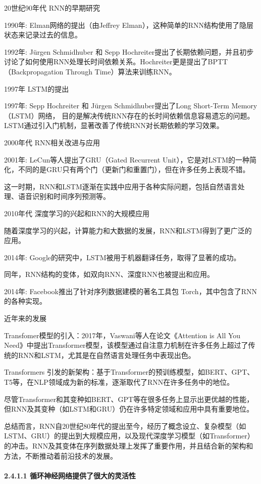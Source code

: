 20世纪90年代 RNN的早期研究

1990年: Elman网络的提出（由Jeffrey
Elman），这种简单的RNN结构使用了隐层状态来记录过去的信息。

1992年: Jürgen Schmidhuber 和 Sepp
Hochreiter提出了长期依赖问题，并且初步讨论了如何使用RNN处理长时间依赖关系。Hochreiter更是提出了BPTT（Backpropagation
Through Time）算法来训练RNN。

1997年 LSTM的提出

1997年: Sepp Hochreiter 和 Jürgen Schmidhuber提出了Long Short-Term
Memory（LSTM）网络，
目的是解决传统RNN存在的长时间依赖信息容易遗忘的问题。LSTM通过引入门机制，显著改善了传统RNN对长期依赖的学习效果。

2000年代 RNN相关改进与应用

2001年: LeCun等人提出了GRU（Gated Recurrent
Unit），它是对LSTM的一种简化，不同的是GRU只有两个门（更新门和重置门），但在许多任务上表现不错。

这一时期，RNN和LSTM逐渐在实践中应用于各种实际问题，包括自然语言处理、语音识别和时间序列预测等。

2010年代 深度学习的兴起和RNN的大规模应用

随着深度学习的兴起，计算能力和大数据的发展，RNN和LSTM得到了更广泛的应用。

2014年: Google的研究中，LSTM被用于机器翻译任务，取得了显著的成功。

同年，RNN结构的变体，如双向RNN、深度RNN也被提出和应用。

2014年: Facebook推出了针对序列数据建模的著名工具包
Torch，其中包含了RNN的各种实现。

近年来的发展

Transfomer模型的引入：2017年，Vaswani等人在论文《Attention is All You
Need》中提出Transformer模型，该模型通过自注意力机制在许多任务上超过了传统的RNN和LSTM，尤其是在自然语言处理任务中表现出色。

Transformers
引发的新架构：基于Transformer的预训练模型，如BERT、GPT、T5等，在NLP领域成为新的标准，逐渐取代了RNN在许多任务中的地位。

尽管Transformer和其变种如BERT、GPT等在很多任务上显示出更优越的性能，但RNN及其变种（如LSTM和GRU）仍在许多特定领域和应用中具有重要地位。

总结而言，RNN自20世纪80年代的提出至今，经历了概念设立、复杂模型（如LSTM、GRU）的提出到大规模应用，以及现代深度学习模型（如Transformer）的冲击。RNN及其变体在序列数据处理上发挥了重要作用，并且结合新的架构和方法，不断推动着前沿技术的发展。

\paragraph{\texorpdfstring{\textbf{2.4.1.1
循环神经网络提供了很大的灵活性}}{2.4.1.1 循环神经网络提供了很大的灵活性}}\label{2411-ux5faaux73afux795eux7ecfux7f51ux7edcux63d0ux4f9bux4e86ux5f88ux5927ux7684ux7075ux6d3bux6027}

